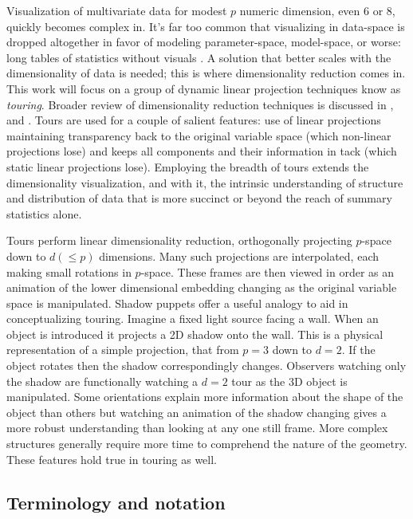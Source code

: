 \documentclass{monashthesis}
\begin{document}
Visualization of multivariate data for modest \(p\) numeric dimension,
even 6 or 8, quickly becomes complex in. It's far too common that
visualizing in data-space is dropped altogether in favor of modeling
parameter-space, model-space, or worse: long tables of statistics
without visuals \autocite{wickham_visualizing_2015}. A solution that
better scales with the dimensionality of data is needed; this is where
dimensionality reduction comes in. This work will focus on a group of
dynamic linear projection techniques know as \emph{touring}. Broader
review of dimensionality reduction techniques is discussed in
\textcite{grinstein_high-dimensional_2002}, and
\textcite{heer_tour_2010}. Tours are used for a couple of salient
features: use of linear projections maintaining transparency back to the
original variable space (which non-linear projections lose) and keeps
all components and their information in tack (which static linear
projections lose). Employing the breadth of tours extends the
dimensionality visualization, and with it, the intrinsic understanding
of structure and distribution of data that is more succinct or beyond
the reach of summary statistics alone.

Tours perform linear dimensionality reduction, orthogonally projecting
\(p\)-space down to \(d(\leq p)\) dimensions. Many such projections are
interpolated, each making small rotations in \(p\)-space. These frames
are then viewed in order as an animation of the lower dimensional
embedding changing as the original variable space is manipulated. Shadow
puppets offer a useful analogy to aid in conceptualizing touring.
Imagine a fixed light source facing a wall. When an object is introduced
it projects a 2D shadow onto the wall. This is a physical representation
of a simple projection, that from \(p=3\) down to \(d=2\). If the object
rotates then the shadow correspondingly changes. Observers watching only
the shadow are functionally watching a \(d=2\) tour as the 3D object is
manipulated. Some orientations explain more information about the shape
of the object than others but watching an animation of the shadow
changing gives a more robust understanding than looking at any one still
frame. More complex structures generally require more time to comprehend
the nature of the geometry. These features hold true in touring as well.

\subsection{Terminology and notation}\label{sec:terminology_tours}
\end{document}
